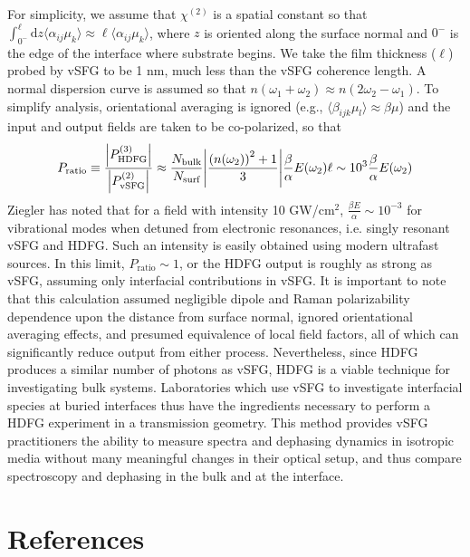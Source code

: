 \documentclass[aip, jcp, reprint, onecolumn, nofootinbib]{revtex4-2}
\begin{document}
For simplicity, we assume that $\chi^{(2)}$ is a spatial constant so that $\int_{0^-}^\ell \mathrm{d}z \langle \alpha_{ij}\mu_{k} \rangle \approx \ell \langle \alpha_{ij}\mu_{k} \rangle$, where $z$ is oriented along the surface normal and $0^{-}$ is the edge of the interface where substrate begins. 
We take the film thickness ($\ell$) probed by vSFG to be 1 nm, much less than the vSFG coherence length.\cite{RN133}
A normal dispersion curve is assumed so that $n(\omega_1+\omega_2) \approx n(2\omega_2-\omega_1)$.
To simplify analysis, orientational averaging is ignored (e.g., $\langle \beta_{ijk} \mu_{l} \rangle \approx \beta \mu$) and the input and output fields are taken to be co-polarized, so that
\begin{equation}
	P_\text{ratio} \equiv \frac{\abs{P^{(3)}_{\text{HDFG}}}}{\abs{P^{(2)}_{\text{vSFG}}}} \approx \frac{N_\text{bulk}}{N_\text{surf}} \abs{\frac{\left(n(\omega_2)\right)^2 + 1}{3}} \frac{\beta}{\alpha} E(\omega_2) \ell \sim 10^3 \frac{\beta}{\alpha} E(\omega_2)\\
\end{equation}
Ziegler has noted that for a field with intensity 10 GW/cm$^{2}$, $\frac{\beta E}{\alpha} \sim 10^{-3} $ for vibrational modes when detuned from electronic resonances, i.e. singly resonant vSFG and HDFG. \cite{RN515}
Such an intensity is easily obtained using modern ultrafast sources.
In this limit, $P_\text{ratio} \sim 1$, or the HDFG output is roughly as strong as vSFG, assuming only interfacial contributions in vSFG.
It is important to note that this calculation assumed negligible dipole and Raman polarizability dependence upon the distance from surface normal, ignored orientational averaging effects, and presumed equivalence of local field factors, all of which can significantly reduce output from either process. 
Nevertheless, since HDFG produces a similar number of photons as vSFG, HDFG is a viable technique for investigating bulk systems.
Laboratories which use vSFG to investigate interfacial species at buried interfaces thus have the ingredients necessary to perform a HDFG experiment in a transmission geometry. \cite{Piontek2023_1}
This method provides vSFG practitioners the ability to measure spectra and dephasing dynamics in isotropic media without many meaningful changes in their optical setup, and thus compare spectroscopy and dephasing in the bulk and at the interface.\cite{RN224}



\section{References}

\end{document}
